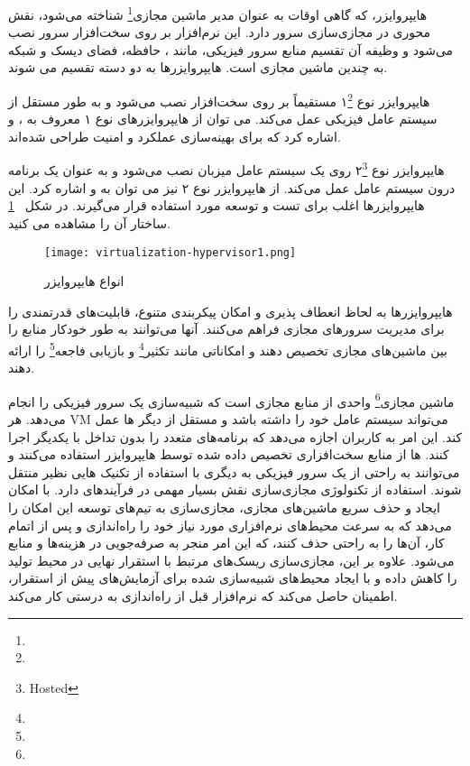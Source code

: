هایپروایزر، که گاهی اوقات به عنوان مدیر ماشین مجازی\footnote{} شناخته می‌شود، نقش محوری در مجازی‌سازی سرور دارد. این نرم‌افزار بر روی سخت‌افزار سرور نصب می‌شود و وظیفه آن تقسیم منابع سرور فیزیکی، مانند ، حافظه، فضای دیسک و شبکه به چندین ماشین مجازی است. هایپروایزرها به دو دسته تقسیم می شوند. 

هایپروایزر نوع ۱\footnote{} مستقیماً بر روی سخت‌افزار نصب می‌شود و به طور مستقل از سیستم عامل فیزیکی عمل می‌کند. می توان از هایپروایزرهای نوع ۱ معروف به ، و  اشاره کرد که برای بهینه‌سازی عملکرد و امنیت طراحی شده‌اند.

هایپروایزر نوع ۲\footnote{Hosted} روی یک سیستم عامل میزبان نصب می‌شود و به عنوان یک برنامه درون سیستم عامل عمل می‌کند. از هایپروایزر نوع ۲ نیز می توان به  و  اشاره کرد. این هایپروایزرها اغلب برای تست و توسعه مورد استفاده قرار می‌گیرند. در شکل 
~\ref{fig: hypervisors types} 
ساختار آن را مشاهده می کنید. 
\begin{figure}[t]
	\centering
	\texttt{[image: virtualization-hypervisor1.png]}
	\caption{انواع هایپروایزر \cite{virtualization1}}
	\label{fig: hypervisors types}
\end{figure}

هایپروایزرها به لحاظ انعطاف پذیری و امکان پیکربندی متنوع، قابلیت‌های قدرتمندی را برای مدیریت سرورهای مجازی فراهم می‌کنند. آنها می‌توانند به طور خودکار منابع را بین ماشین‌های مجازی تخصیص دهند و امکاناتی مانند تکثیر\footnote{} و بازیابی فاجعه\footnote{} را ارائه دهند.

ماشین مجازی\footnote{} واحدی از منابع مجازی است که شبیه‌سازی یک سرور فیزیکی را انجام می‌دهد. هر VM می‌تواند سیستم عامل خود را داشته باشد و مستقل از دیگر ‌ها عمل کند. این امر به کاربران اجازه می‌دهد که برنامه‌های متعدد را بدون تداخل با یکدیگر اجرا کنند. ‌ها از منابع سخت‌افزاری تخصیص داده شده توسط هایپروایزر استفاده می‌کنند و می‌توانند به راحتی از یک سرور فیزیکی به دیگری با استفاده از تکنیک هایی نظیر  منتقل شوند. 
استفاده از تکنولوژی مجازی‌سازی نقش بسیار مهمی در فرآیندهای  دارد. با امکان ایجاد و حذف سریع ماشین‌های مجازی، مجازی‌سازی به تیم‌های توسعه این امکان را می‌دهد که به سرعت محیط‌های نرم‌افزاری مورد نیاز خود را راه‌اندازی و پس از اتمام کار، آن‌ها را به راحتی حذف کنند، که این امر منجر به صرفه‌جویی در هزینه‌ها و منابع می‌شود. علاوه بر این، مجازی‌سازی ریسک‌های مرتبط با استقرار نهایی در محیط تولید را کاهش داده و با ایجاد محیط‌های شبیه‌سازی شده برای آزمایش‌های پیش از استقرار، اطمینان حاصل می‌کند که نرم‌افزار قبل از راه‌اندازی به درستی کار می‌کند.
